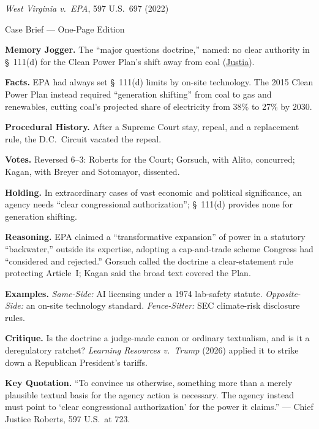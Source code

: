 \documentclass[12pt]{article}
\begin{document}
\begin{center}
{\Large \textit{West Virginia v.\ EPA}, 597 U.S.\ 697 (2022)\par}
\vspace{0.3em}
{\normalsize Case Brief --- One-Page Edition\par}
\end{center}

\textbf{Memory Jogger.} The ``major questions doctrine,'' named: no clear authority in \S~111(d) for the Clean Power Plan's shift away from coal (\href{https://supreme.justia.com/cases/federal/us/597/20-1530/}{Justia}).

\textbf{Facts.} EPA had always set \S~111(d) limits by on-site technology. The 2015 Clean Power Plan instead required ``generation shifting'' from coal to gas and renewables, cutting coal's projected share of electricity from 38\% to 27\% by 2030.

\textbf{Procedural History.} After a Supreme Court stay, repeal, and a replacement rule, the D.C.\ Circuit vacated the repeal.

\textbf{Votes.} Reversed 6--3: Roberts for the Court; Gorsuch, with Alito, concurred; Kagan, with Breyer and Sotomayor, dissented.

\textbf{Holding.} In extraordinary cases of vast economic and political significance, an agency needs ``clear congressional authorization''; \S~111(d) provides none for generation shifting.

\textbf{Reasoning.} EPA claimed a ``transformative expansion'' of power in a statutory ``backwater,'' outside its expertise, adopting a cap-and-trade scheme Congress had ``considered and rejected.'' Gorsuch called the doctrine a clear-statement rule protecting Article~I; Kagan said the broad text covered the Plan.

\textbf{Examples.} \emph{Same-Side:} AI licensing under a 1974 lab-safety statute. \emph{Opposite-Side:} an on-site technology standard. \emph{Fence-Sitter:} SEC climate-risk disclosure rules.

\textbf{Critique.} Is the doctrine a judge-made canon or ordinary textualism, and is it a deregulatory ratchet? \textit{Learning Resources v.\ Trump} (2026) applied it to strike down a Republican President's tariffs.

\textbf{Key Quotation.} ``To convince us otherwise, something more than a merely plausible textual basis for the agency action is necessary. The agency instead must point to `clear congressional authorization' for the power it claims.'' --- Chief Justice Roberts, 597 U.S.\ at 723.
\end{document}
